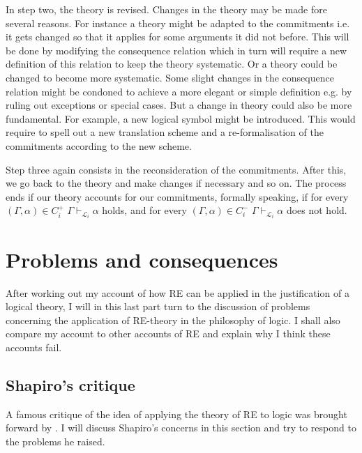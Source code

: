 \documentclass{article}
\begin{document}
In step two, the theory is revised. Changes in the theory may be made fore several reasons. For instance a theory might be adapted to the commitments i.e. it gets changed so that it applies for some arguments it did not before. This will be done by modifying the consequence relation which in turn will require a new definition of this relation to keep the theory systematic. Or a theory could be changed to become more systematic. Some slight changes in the consequence relation might be condoned to achieve a more elegant or simple definition e.g. by ruling out exceptions or special cases. But a change in theory could also be more fundamental. For example, a new logical symbol might be introduced. This would require to spell out a new translation scheme and a re-formalisation of the commitments according to the new scheme. 

Step three again consists in the reconsideration of the commitments. After this, we go back to the theory and make changes if necessary and so on. The process ends if our theory accounts for our commitments, formally speaking, if for every $(\Gamma,\alpha)\in C_i^+$ $\Gamma\vdash_{\mathcal{L}_i}\alpha$ holds, and for every $(\Gamma,\alpha)\in C_i^-$ $\Gamma\vdash_{\mathcal{L}_i}\alpha$ does not hold.

\section{Problems and consequences}
After working out my account of how RE can be applied in the justification of a logical theory, I will in this last part turn to the discussion of problems concerning the application of RE-theory in the philosophy of logic. I shall also compare my account to other accounts of RE and explain why I think these accounts fail.

\subsection{Shapiro's critique}
A famous critique of the idea of applying the theory of RE to logic was brought forward by . I will discuss Shapiro's concerns in this section and try to respond to the problems he raised.
\end{document}
